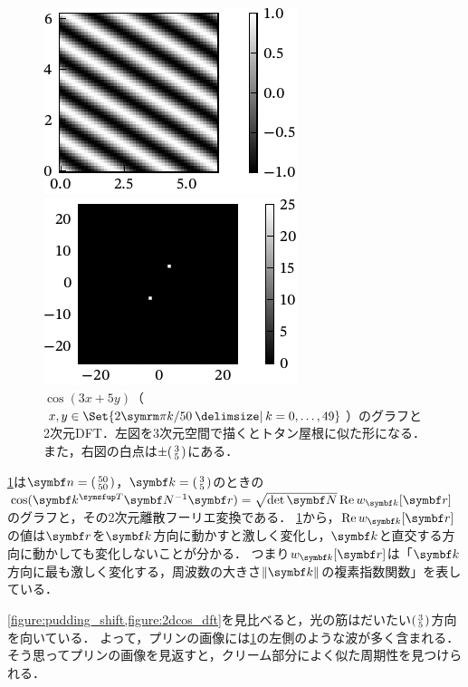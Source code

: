 \documentclass[../../main]{subfiles}
\begin{document}
\begin{figure}[htbp]
  \begin{minipage}{\linewidth/2}
    \centering
    \includegraphics{figures/2dcos.pdf}
    \end{minipage}%
  \begin{minipage}{\linewidth/2}
    \centering
    \includegraphics{figures/2dcos_dft.pdf}
  \end{minipage}
  \caption{\(\cos(3x+5y)\)（\(x,y\in\Set{2\krez k/50\given k=0,\dots,49}\)）のグラフと2次元DFT．左図を3次元空間で描くとトタン屋根に似た形になる．また，右図の白点は\(\pm\begin{psmallmatrix}3 \\ 5\end{psmallmatrix}\)にある．}
  \label{figure:2dcos_dft}
\end{figure}

\cref{figure:2dcos_dft}は\(\vect{n}=\smallmatrice{50 \\ 50}\)，\(\vect{k}=\smallmatrice{3 \\ 5}\)のときの\(\cos(\trps{\vect{k}}\mat{N}^{-1}\vect{r})=\sqrt{\det\mat{N}}\rpart w_{\vect{k}}[\vect{r}]\)のグラフと，その2次元離散フーリエ変換である．
\cref{figure:2dcos_dft}から，\(\rpart w_{\vect{k}}[\vect{r}]\)の値は\(\vect{r}\)を\(\vect{k}\)方向に動かすと激しく変化し，\(\vect{k}\)と直交する方向に動かしても変化しないことが分かる．
つまり\(w_{\vect{k}}[\vect{r}]\)は「\(\vect{k}\)方向に最も激しく変化する，周波数の大きさ\(\vnorm{\vect{k}}\)の複素指数関数」を表している．

\cref{figure:pudding_shift,figure:2dcos_dft}を見比べると，光の筋はだいたい\(\begin{psmallmatrix}3 \\ 5\end{psmallmatrix}\)方向を向いている．
よって，プリンの画像には\cref{figure:2dcos_dft}の左側のような波が多く含まれる．そう思ってプリンの画像を見返すと，クリーム部分によく似た周期性を見つけられる．
\end{document}
